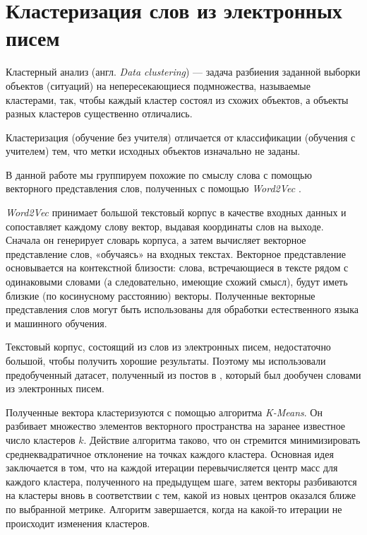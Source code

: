 \section{Кластеризация слов из электронных писем}

Кластерный анализ (англ. \textit{Data clustering}) — задача разбиения заданной выборки объектов (ситуаций) на непересекающиеся подмножества, называемые кластерами, так, чтобы каждый кластер состоял из схожих объектов, а объекты разных кластеров существенно отличались.

Кластеризация (обучение без учителя) отличается от классификации (обучения с учителем) тем, что метки исходных объектов изначально не заданы. 

В данной работе мы группируем похожие по смыслу слова с помощью векторного представления слов, полученных с помощью \textit{Word2Vec} \cite{bib5}. 

\textit{Word2Vec} принимает большой текстовый корпус в качестве входных данных и сопоставляет каждому слову вектор, выдавая координаты слов на выходе. Сначала он генерирует словарь корпуса, а затем вычисляет векторное представление слов, «обучаясь» на входных текстах. Векторное представление основывается на контекстной близости: слова, встречающиеся в тексте рядом с одинаковыми словами (а следовательно, имеющие схожий смысл), будут иметь близкие (по косинусному расстоянию) векторы. Полученные векторные представления слов могут быть использованы для обработки естественного языка и машинного обучения.

Текстовый корпус, состоящий из слов из электронных писем, недостаточно большой, чтобы получить хорошие результаты. Поэтому мы использовали предобученный датасет, полученный из постов в  \cite{bib6}, который был дообучен словами из электронных писем.

Полученные вектора кластеризуются с помощью алгоритма \textit{K-Means}. Он разбивает множество элементов векторного пространства на заранее известное число кластеров $k$. Действие алгоритма таково, что он стремится минимизировать среднеквадратичное отклонение на точках каждого кластера. Основная идея заключается в том, что на каждой итерации перевычисляется центр масс для каждого кластера, полученного на предыдущем шаге, затем векторы разбиваются на кластеры вновь в соответствии с тем, какой из новых центров оказался ближе по выбранной метрике. Алгоритм завершается, когда на какой-то итерации не происходит изменения кластеров.

\newpage


